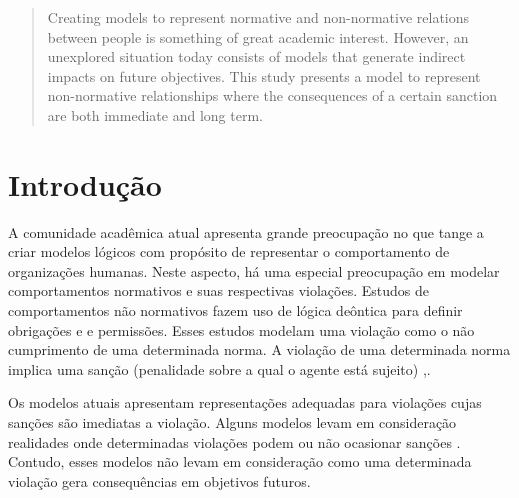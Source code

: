 \documentclass[a0,portrait]{a0poster}
\begin{document}
\begin{multicols}{2} %

\color{Navy} %

\begin{abstract}
Creating models to represent normative and non-normative relations between people is something of great academic interest. However, an unexplored situation today consists of models that generate indirect impacts on future objectives. This study presents a model to represent non-normative relationships where the consequences of a certain sanction are both immediate and long term.
\end{abstract}


\color{SaddleBrown} %

\section*{Introdução}

A comunidade acadêmica atual apresenta grande preocupação no que tange a criar modelos lógicos
com propósito de representar o comportamento de organizações humanas. Neste aspecto, há uma 
especial preocupação em modelar comportamentos normativos e suas respectivas violações.
Estudos de comportamentos não normativos fazem uso de lógica deôntica para definir obrigações e 
e permissões. Esses estudos modelam uma violação como o não cumprimento de uma determinada norma. 
A violação de uma determinada norma implica uma sanção (penalidade sobre a qual o agente está sujeito)
\cite{SimulationNonNormative},\cite{ControllingNonNormative}.

Os modelos atuais apresentam representações adequadas para violações cujas sanções são imediatas a 
violação. Alguns modelos levam em consideração realidades onde determinadas violações podem ou não 
ocasionar sanções \cite{HowDoAgentMakeDecision}. Contudo, esses modelos não levam em consideração
como uma determinada violação gera consequências em objetivos futuros. 
		  

\end{multicols}
\end{document}
